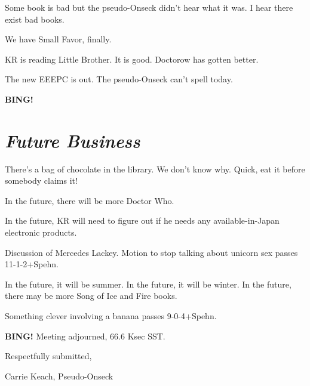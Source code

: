 \documentclass[10pt]{article}
\newcommand{\bing}{{\bf BING!} }
\newcommand{\goto}[1]{\bing \vskip 12pt \section*{{\em{#1}}}}
\begin{document}
Some book is bad but the pseudo-Onseck didn't hear what it was. I hear 
there exist bad books.

We have Small Favor, finally.

KR is reading Little Brother. It is good. Doctorow has gotten better.

The new EEEPC is out. The pseudo-Onseck can't spell today.

\goto{Future Business}

There's a bag of chocolate in the library. We don't know why. Quick, eat 
it before somebody claims it!

In the future, there will be more Doctor Who. 

In the future, KR will need to figure out if he needs any 
available-in-Japan electronic products.

Discussion of Mercedes Lackey. Motion to stop talking about unicorn sex 
passes 11-1-2+Spehn.

In the future, it will be summer. In the future, it will be winter. In the 
future, there may be more Song of Ice and Fire books.

Something clever involving a banana passes 9-0-4+Spehn.

\bing
\noindent
Meeting adjourned, 66.6 Ksec SST.

\vspace{18pt}

\centerline{Respectfully submitted,}
\centerline{Carrie Keach, Pseudo-Onseck}
\end{document}
